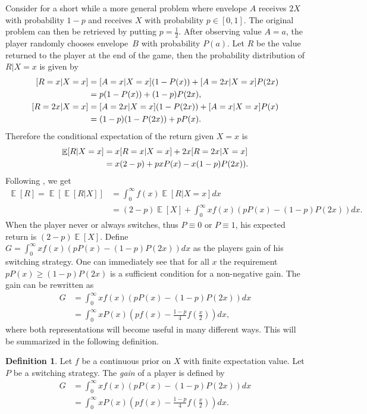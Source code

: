 \documentclass[a4paper]{report}
\theoremstyle{plain}
\theoremstyle{definition}
\newtheorem{definition}[theorem]{Definition}
\theoremstyle{remark}
\numberwithin{equation}{chapter}
\let\P\relax
\DeclareMathOperator{\P}{\mathbb{P}}
\DeclareMathOperator{\E}{\mathbb{E}}
\DeclareMathOperator{\1}{\mathbbm{1}}
\begin{document}
Consider for a short while a more general problem where envelope $A$ receives $2X$ with probability $1-p$ and receives $X$ with probability $p\in[0,1]$. The original problem can then be retrieved by putting $p=\frac{1}{2}$. After observing value $A=a$, the player randomly chooses envelope~$B$ with probability $P(a)$. Let $R$ be the value returned to the player at the end of the game, then the probability distribution of $R|X=x$ is given by
\begin{align}
\P[R=x|X=x]&=\P[A=x|X=x](1-P(x))+\P[A=2x|X=x]P(2x)\\
&=p(1-P(x))+(1-p)P(2x),\\
\P[R=2x|X=x]&=\P[A=2x|X=x](1-P(2x))+\P[A=x|X=x]P(x)\\
&=(1-p)(1-P(2x))+pP(x).
\end{align}
Therefore the conditional expectation of the return given $X=x$ is
\begin{align}
\E[R|X=x]&=x\P[R=x|X=x]+2x\P[R=2x|X=x]\\
&=x(2-p)+pxP(x)-x(1-p)P(2x)).
\end{align}
Following \cite{McDonnell09}, we get
\begin{align}
\E[R]=\E[\E[R|X]]&=\int_0^\infty f(x)\E[R|X=x]dx\\
&=(2-p)\E[X]+\int_0^\infty xf(x)(pP(x)-(1-p)P(2x))dx.
\end{align}
When the player never or always switches, thus $P\equiv0$ or $P\equiv1$, his expected return is $(2-p)\E[X]$. Define $G=\int_0^\infty xf(x)(pP(x)-(1-p)P(2x))dx$ as the players gain of his switching strategy. One can immediately see that for all $x$ the requirement $pP(x)\geq(1-p)P(2x)$ is a sufficient condition for a non-negative gain. The gain can be rewritten as
\begin{align}
G&=\int_0^\infty xf(x)(pP(x)-(1-p)P(2x))dx\\
&=\int_0^\infty xP(x)\left(pf(x)-\frac{1-p}{4}f\left(\frac{x}{2}\right)\right)dx,
\end{align}
where both representations will become useful in many different ways. This will be summarized in the following definition.
\begin{definition}
Let $f$ be a continuous prior on $X$ with finite expectation value. Let $P$ be a switching strategy. The \emph{gain} of a player is defined by
\begin{align}
G&=\int_0^\infty xf(x)(pP(x)-(1-p)P(2x))dx\label{eq:EnvelopeGainP}\\
&=\int_0^\infty xP(x)\left(pf(x)-\frac{1-p}{4}f\left(\frac{x}{2}\right)\right)dx.\label{eq:EnvelopeGainF}
\end{align}
\end{definition}
\end{document}
